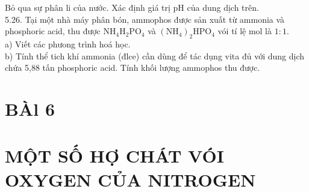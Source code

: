 \documentclass[10pt]{article}
\begin{document}
Bỏ qua sự phân li của nước. Xác định giá trị pH của dung dịch trên.\\
5.26. Tại một nhà máy phân bón, ammophos được sản xuất từ ammonia và phosphoric acid, thu được $\mathrm{NH}_{4} \mathrm{H}_{2} \mathrm{PO}_{4}$ và $\left(\mathrm{NH}_{4}\right)_{2} \mathrm{HPO}_{4}$ vói tí lệ mol là $1: 1$.\\
a) Viết các phưong trình hoá học.\\
b) Tính thể tich khí ammonia (đlce) cần dùng để tác dụng vita đủ với dung dịch chứa 5,88 tấn phosphoric acid. Tính khối lượng ammophos thu được.

\section*{BÀl 6}
\section*{MỘT SỐ HỢ CHÁT VÓI OXYGEN CỦA NITROGEN}
\end{document}
